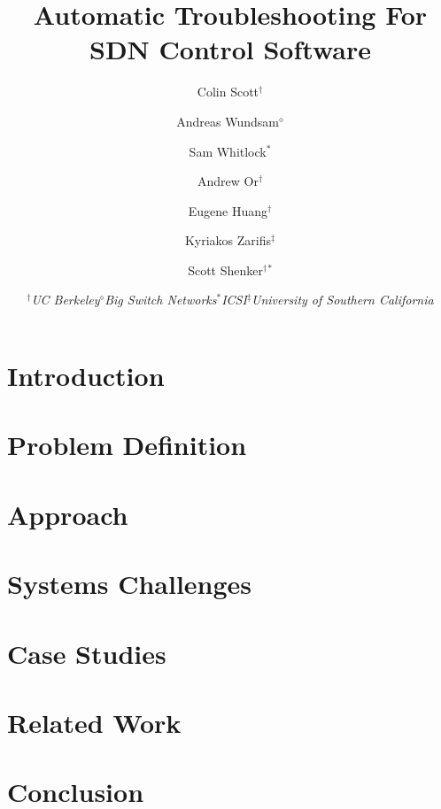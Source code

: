 \documentclass{sig-alt-hotnets}
\begin{document}
    \date{}

\title{Automatic Troubleshooting For SDN Control Software}

\author{Colin Scott$^\dagger$ %
\and Andreas Wundsam$^\diamond$ %
\and Sam Whitlock$^*$ %
\and Andrew Or$^\dagger$ %
\and Eugene Huang$^\dagger$ %
\and Kyriakos Zarifis$^\ddagger$ %
\and Scott Shenker$^\dagger$$^*$ %
\and {\begin{tabular}{cccc}$^\dagger${\large\it UC Berkeley} &
$^\diamond${\large\it Big Switch Networks}
& $^*${\large\it ICSI} & $^\ddagger${\large\it University of Southern
California}\end{tabular}}}

\date{}
    \maketitle
    \thispagestyle{empty}

\abstract{{\it }}

\section{Introduction}
\label{sec:intro}


\section{Problem Definition}
\label{sec:formalism}


\section{Approach}
\label{sec:approach}


\section{Systems Challenges}
\label{sec:systems_challenges}


\section{Case Studies}
\label{sec:casestudies}


\section{Related Work}
\label{sec:relatedwork}


\section{Conclusion}
\label{sec:conclusion}


\newpage
 

%
\end{document}
